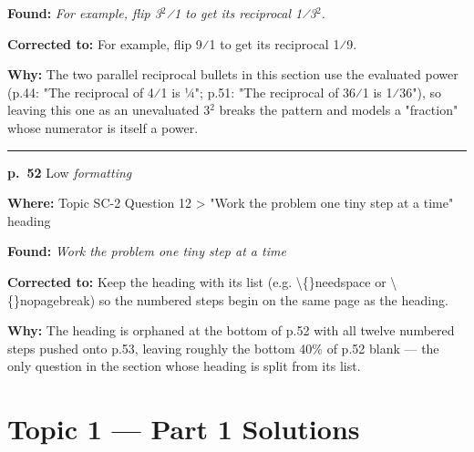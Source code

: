 \documentclass[11pt]{article}
\newcommand{\sevlow}[1]{\textcolor{black!55}{#1}}
\begin{document}
\noindent\textbf{Found: }\textit{For example, flip 3$^2$⁄1 to get its reciprocal 1⁄3$^2$.}\par
\noindent\textbf{Corrected to: }For example, flip 9⁄1 to get its reciprocal 1⁄9.\par
\noindent\textbf{Why: }The two parallel reciprocal bullets in this section use the evaluated power (p.44: "The reciprocal of 4⁄1 is 1⁄4"; p.51: "The reciprocal of 36⁄1 is 1⁄36"), so leaving this one as an unevaluated 3$^2$ breaks the pattern and models a "fraction" whose numerator is itself a power.\par\vspace{4pt}
\noindent\rule{\textwidth}{0.4pt}\par\nobreak\vspace{2pt}
\noindent\textbf{p.~52} \quad \sevlow{Low} \quad \textit{formatting}\par
\noindent\textbf{Where: }Topic SC-2 Question 12 > "Work the problem one tiny step at a time" heading\par
\noindent\textbf{Found: }\textit{Work the problem one tiny step at a time}\par
\noindent\textbf{Corrected to: }Keep the heading with its list (e.g. \textbackslash\{\}needspace or \textbackslash\{\}nopagebreak) so the numbered steps begin on the same page as the heading.\par
\noindent\textbf{Why: }The heading is orphaned at the bottom of p.52 with all twelve numbered steps pushed onto p.53, leaving roughly the bottom 40\% of p.52 blank --- the only question in the section whose heading is split from its list.\par\vspace{4pt}
\newpage\section*{Topic 1 --- Part 1 Solutions}
\end{document}
